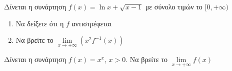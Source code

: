 \documentclass{presentation}
\begin{document}
\begin{askisi}
  Δίνεται η συνάρτηση $f(x)=\ln x + \sqrt{x-1}$ με σύνολο τιμών το $[0,+\infty)$
  \begin{enumerate}
    \item Να δείξετε ότι η $f$ αντιστρέφεται \pause
    \item Να βρείτε το $\lim\limits_{x \to +\infty}{ \left( x^2f^{-1}(x) \right)  }$
  \end{enumerate}
\end{askisi}

\begin{askisi}
  Δίνεται η συνάρτηση $f(x)=x^x$, $x>0$. Να βρείτε το $\lim\limits_{x \to +\infty}{ f(x)  }$
\end{askisi}

\section{}

\moodle
\end{document}
